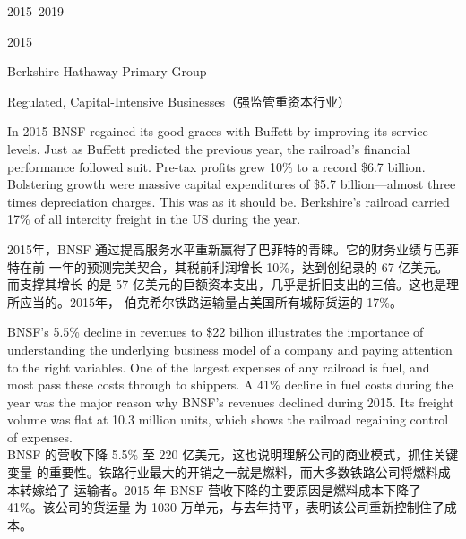 \begin{chapter}{2015--2019}
\begin{section}{2015}
\begin{subsection}{Berkshire Hathaway Primary Group}
\end{subsection}

\begin{subsection}{Regulated, Capital-Intensive Businesses（强监管重资本行业）}
\begin{verseparallel}
  {

    In 2015 BNSF regained its good graces with Buffett by improving its service
    levels. Just as Buffett predicted the previous year, the railroad's
    financial performance followed suit. Pre-tax profits grew 10\% to a record
    \$6.7 billion. Bolstering growth were massive capital expenditures of \$5.7
    billion—almost three times depreciation charges. This was as it should be. Berkshire's railroad carried
    17\% of all intercity freight in the
    US during the year. \\

  }
  {
    2015年，BNSF 通过提高服务水平重新赢得了巴菲特的青睐。它的财务业绩与巴菲特在前
    一年的预测完美契合，其税前利润增长 10\%，达到创纪录的 67 亿美元。而支撑其增长
    的是 57 亿美元的巨额资本支出，几乎是折旧支出的三倍。这也是理所应当的。2015年，
    伯克希尔铁路运输量占美国所有城际货运的 17\%。
  }
\end{verseparallel}

\begin{verseparallel}
  {
    BNSF's 5.5\% decline in revenues to \$22 billion illustrates the importance
    of understanding the underlying business model of a company and paying
    attention to the right variables. One of the largest expenses of any
    railroad is fuel, and most pass these costs through to shippers. A 41\%
    decline in fuel costs during the year was the major reason why BNSF's
    revenues declined during 2015. Its freight volume was flat at 10.3 million
    units, which shows the railroad regaining control of expenses. \\
  }
  {
    BNSF 的营收下降 5.5\% 至 220 亿美元，这也说明理解公司的商业模式，抓住关键变量
    的重要性。铁路行业最大的开销之一就是燃料，而大多数铁路公司将燃料成本转嫁给了
    运输者。2015 年 BNSF 营收下降的主要原因是燃料成本下降了 41\%。该公司的货运量
    为 1030 万单元，与去年持平，表明该公司重新控制住了成本。
  }
\end{verseparallel}


\end{subsection}
\end{section}
\end{chapter}
